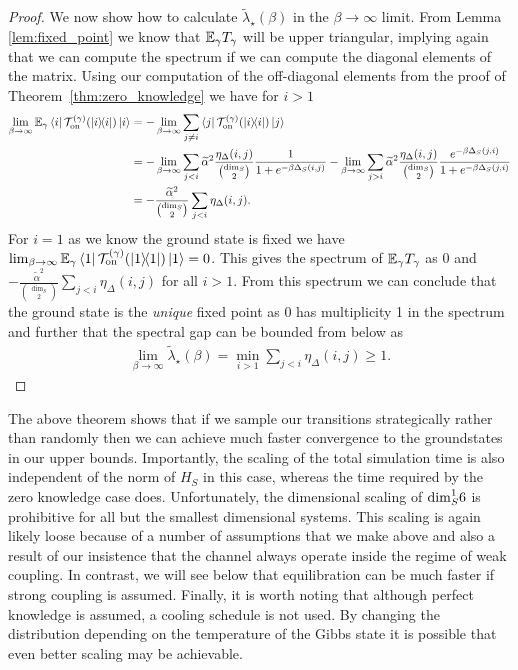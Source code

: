 \begin{proof}
We now show how to calculate $\widetilde{\lambda}_\star(\beta)$ in the $\beta \to \infty$ limit. From Lemma \ref{lem:fixed_point} we know that $\mathbb{E}_\gamma T_\gamma$ will be upper triangular, implying again that we can compute the spectrum if we can compute the diagonal elements of the matrix. Using our computation of the off-diagonal elements from the proof of Theorem~\ref{thm:zero_knowledge} we have for $i > 1$
\begin{align}
    \lim_{\beta \to \infty} \mathbb{E}_\gamma \bra{i} \mathcal{T}_{\rm on}^{(\gamma)}(\ketbra{i}{i}) \ket{i} &= - \lim_{\beta \to \infty} \sum_{j \neq i} \bra{j} \mathcal{T}_{\rm on}^{(\gamma)}(\ketbra{i}{i}) \ket{j} \\
    &= - \lim_{\beta \to \infty} \sum_{j < i} \widetilde{\alpha}^2 \frac{\eta_\Delta(i,j)}{\binom{\dim_S}{2}} \frac{1}{1 + e^{-\beta \Delta_S(i,j)}} - \lim_{\beta \to \infty} \sum_{j > i} \widetilde{\alpha}^2 \frac{\eta_\Delta(i,j)}{\binom{\dim_S}{2}} \frac{e^{-\beta \Delta_S(j, i)}}{1 + e^{-\beta \Delta_S(j, i)}} \\
    &= - \frac{\widetilde{\alpha}^2}{\binom{\dim_S}{2}} \sum_{j < i} \eta_\Delta(i,j).
\end{align}
For $i = 1$ as we know the ground state is fixed we have $\lim_{\beta \to \infty} \mathbb{E}_\gamma \bra{1} \mathcal{T}_{\rm on}^{(\gamma)}(\ketbra{1}{1}) \ket{1} = 0$. This gives the spectrum of $\mathbb{E}_\gamma T_\gamma$ as 0 and $- \frac{\widetilde{\alpha}^2}{\binom{\dim_S}{2}} \sum_{j < i} \eta_\Delta(i,j)$ for all $i > 1$. From this spectrum we can conclude that the ground state is the \emph{unique} fixed point as 0 has multiplicity 1 in the spectrum and further that the spectral gap can be bounded from below as
\begin{align}
    \lim_{\beta \to \infty} \widetilde{\lambda}_\star(\beta) = \min_{i > 1} \sum_{j < i} \eta_\Delta(i,j) \ge 1.
\end{align}
\end{proof}

The above theorem shows that if we sample our transitions strategically rather than randomly then we can achieve much faster convergence to the groundstates in our upper bounds.  Importantly, the scaling of the total simulation time is also independent of the norm of $H_S$ in this case, whereas the time required by the zero knowledge case does.  Unfortunately, the dimensional scaling of ${\rm dim}_S^16$ is prohibitive for all but the smallest dimensional systems.  This scaling is again likely loose because of a number of assumptions that we make above and also a result of our insistence that the channel always operate inside the regime of weak coupling.  In contrast, we will see below that equilibration can be much faster if strong coupling is assumed.  Finally, it is worth noting that although perfect knowledge is assumed, a cooling schedule is not used.  By changing the distribution depending on the temperature of the Gibbs state it is possible that even better scaling may be achievable.


